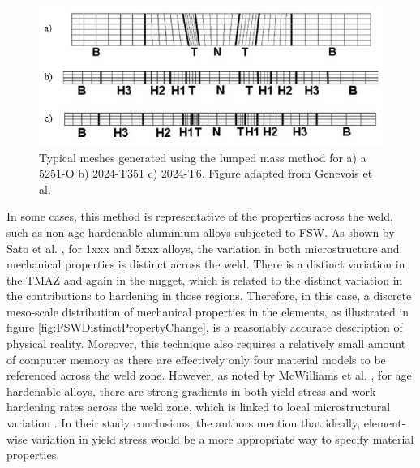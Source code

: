 \begin{figure}[h!]
	\centering
	\includegraphics[width=0.75\linewidth]{Figures/LiteratureReview/FEMeshLumpedMass}
	\caption[Lumped mass method FE mesh]{Typical meshes generated using the lumped mass method for a) a 5251-O b) 2024-T351 c) 2024-T6. Figure adapted from Genevois et al. \cite{Genevois2006}}
	\label{fig:FEMeshLumpedMass}
\end{figure}
%
In some cases, this method is representative of the properties across the weld, such as non-age hardenable aluminium alloys subjected to FSW. As shown by Sato et al. \cite{Sato2001b}, for 1xxx and 5xxx alloys, the variation in both microstructure and mechanical properties is distinct across the weld. There is a distinct variation in the TMAZ and again in the nugget, which is related to the distinct variation in the contributions to hardening in those regions. Therefore, in this case, a discrete meso-scale distribution of mechanical properties in the elements, as illustrated in figure \ref{fig:FSWDistinctPropertyChange}, is a reasonably accurate description of physical reality. Moreover, this technique also requires a relatively small amount of computer memory as there are effectively only four material models to be referenced across the weld zone. However, as noted by McWilliams et al. \cite{McWilliams2013}, for age hardenable alloys, there are strong gradients in both yield stress and work hardening rates across the weld zone, which is linked to local microstructural variation \cite{Sato2001}. In their study conclusions, the authors mention that ideally, element-wise variation in yield stress would be a more appropriate way to specify material properties. 

